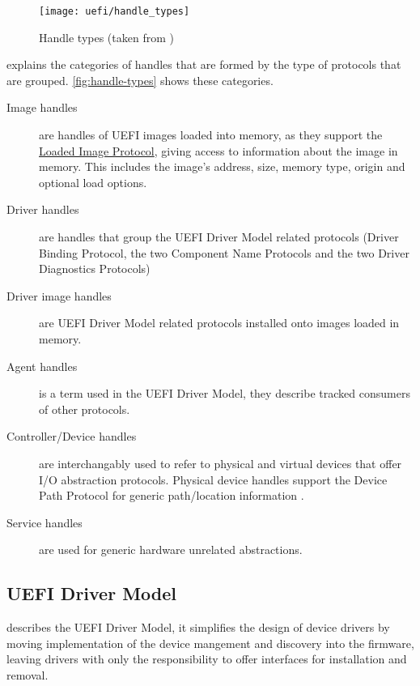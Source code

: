 \begin{figure}[htb]%
    \centering%
    \texttt{[image: uefi/handle\_types]}%
    \caption{Handle types (taken from \cite[Figure 3]{tianocore-edk2-driver-writer-s-guide})}%
    \label{fig:handle-types}%
\end{figure}

\cite{tianocore-edk2-driver-writer-s-guide} explains the categories of handles that are formed by the type of protocols that are grouped. \autoref{fig:handle-types} shows these categories.

\begin{description}
    \item[Image handles] are handles of \ac{UEFI} images loaded into memory, as they support the \hyperref[lst:loaded-image-protocol]{Loaded Image Protocol}, giving access to information about the image in memory. This includes the image's address, size, memory type, origin and optional load options.
    \item[Driver handles] are handles that group the \ac{UEFI} Driver Model related protocols (Driver Binding Protocol, the two Component Name Protocols and the two Driver Diagnostics Protocols)
    \item[Driver image handles] are \ac{UEFI} Driver Model related protocols installed onto images loaded in memory.
    \item[Agent handles] is a term used in the \ac{UEFI} Driver Model, they describe tracked consumers of other protocols.
    \item[Controller/Device handles] are interchangably used to refer to physical and virtual devices that offer \ac{I/O} abstraction protocols.
        Physical device handles support the Device Path Protocol for generic path/location information \cite[Section 10.2]{uefi-spec}.
    \item[Service handles] are used for generic hardware unrelated abstractions.
\end{description}


\subsection{\acs{UEFI} Driver Model}

\cite[Section 2.5.2]{uefi-spec} describes the \acs{UEFI} Driver Model, it simplifies the design of device drivers by moving implementation of the device mangement and discovery into the firmware, leaving drivers with only the responsibility to offer interfaces for installation and removal.

